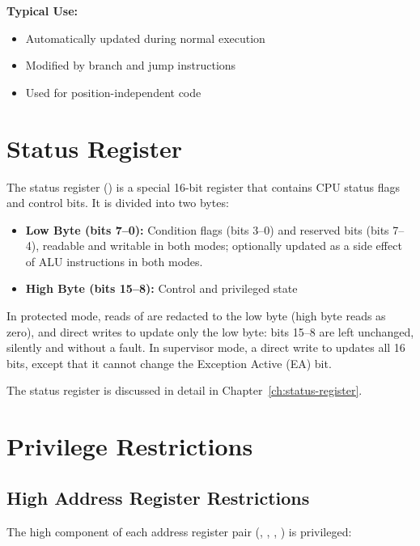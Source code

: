 \textbf{Typical Use:}
\begin{itemize}
	\item Automatically updated during normal execution
	\item Modified by branch and jump instructions
	\item Used for position-independent code
\end{itemize}

\section{Status Register}

The status register () is a special 16-bit register that contains CPU status flags and control bits. It is
divided into two bytes:

\begin{itemize}
	\item \textbf{Low Byte (bits 7--0):} Condition flags (bits 3--0) and reserved bits (bits 7--4), readable and writable in both modes; optionally updated as a
	      side effect of ALU instructions in both modes.
	\item \textbf{High Byte (bits 15--8):} Control and privileged state
\end{itemize}

In protected mode, reads of  are redacted to the low byte (high byte reads as zero), and direct writes to
 update only the low byte: bits 15--8 are left unchanged, silently and without a fault. In supervisor mode, a
direct write to  updates all 16 bits, except that it cannot change the Exception Active (EA) bit.

The status register is discussed in detail in Chapter~\ref{ch:status-register}.

\section{Privilege Restrictions}
\label{sec:privilege-restrictions}

\subsection{High Address Register Restrictions}

The high component of each address register pair (, , , ) is privileged:

